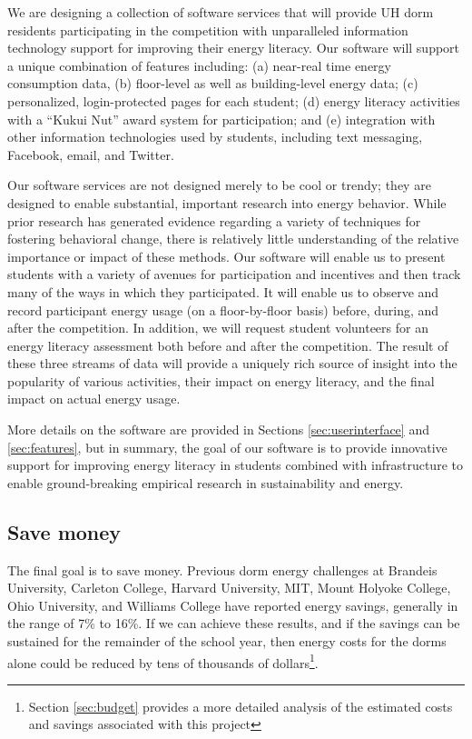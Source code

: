 \documentclass[11pt]{article}
\begin{document}
We are designing a collection of software services that will provide UH
dorm residents participating in the competition with unparalleled
information technology support for improving their energy literacy.  Our
software will support a unique combination of features including: (a)
near-real time energy consumption data, (b) floor-level as well as
building-level energy data; (c) personalized, login-protected pages for
each student; (d) energy literacy activities with a ``Kukui Nut'' award
system for participation; and (e) integration with other information
technologies used by students, including text messaging, Facebook, email,
and Twitter.

Our software services are not designed merely to be cool or trendy; they
are designed to enable substantial, important research into energy
behavior. While prior research has generated evidence regarding a variety
of techniques for fostering behavioral change, there is relatively little
understanding of the relative importance or impact of these methods.  Our
software will enable us to present students with a variety of avenues for
participation and incentives and then track many of the ways in which they
participated. It will enable us to observe and record participant energy
usage (on a floor-by-floor basis) before, during, and after the
competition.  In addition, we will request student volunteers for an energy
literacy assessment both before and after the competition.  The result of
these three streams of data will provide a uniquely rich source of insight
into the popularity of various activities, their impact on energy literacy,
and the final impact on actual energy usage.

More details on the software are provided in Sections
\ref{sec:userinterface} and \ref{sec:features}, but in summary, the goal of
our software is to provide innovative support for improving energy literacy
in students combined with infrastructure to enable ground-breaking
empirical research in sustainability and energy.

\subsection{Save money}

The final goal is to save money.  Previous dorm energy challenges at
Brandeis University, Carleton College, Harvard University, MIT, Mount
Holyoke College, Ohio University, and Williams College have reported energy
savings, generally in the range of 7\% to 16\%.  If we can achieve these
results, and if the savings can be sustained for the remainder of the
school year, then energy costs for the dorms alone could be reduced by tens
of thousands of dollars\footnote{Section \ref{sec:budget} provides a more
  detailed analysis of the estimated costs and savings associated with this
  project}.
\end{document}

